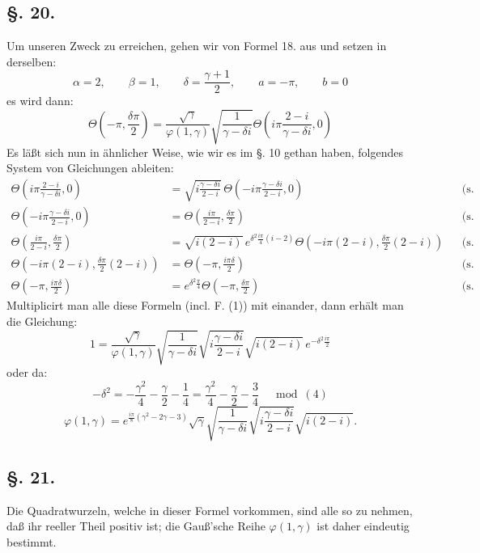 \documentclass[10pt]{article}
\newcommand{\sourceanchor}[1]{\hypertarget{source-#1}{}}
\begin{document}
\subsection*{\S. 20.}
Um unseren Zweck zu erreichen, gehen wir von Formel 18. aus und setzen in derselben:
\[
\alpha=2,
\qquad \beta=1,
\qquad \delta=\frac{\gamma+1}{2},
\qquad a=-\pi,
\qquad b=0
\]
es wird dann:
\begin{equation*}
\Theta\!\left(-\pi,\frac{\delta\pi}{2}\right)
=\frac{\sqrt{\gamma}}{\varphi(1,\gamma)}
\sqrt{\frac{1}{\gamma-\delta i}}
\Theta\!\left(i\pi\frac{2-i}{\gamma-\delta i},0\right)
\tag{1}
\end{equation*}
Es läßt sich nun in ähnlicher Weise, wie wir es im \S. 10 gethan haben, folgendes System von Gleichungen ableiten:
\sourceanchor{PA17}
\begin{align*}
\Theta\!\left(i\pi\frac{2-i}{\gamma-\delta i},0\right)
&=\sqrt{i\frac{\gamma-\delta i}{2-i}}\,
\Theta\!\left(-i\pi\frac{\gamma-\delta i}{2-i},0\right) &&\text{(s. F. 7.)}\\
\Theta\!\left(-i\pi\frac{\gamma-\delta i}{2-i},0\right)
&=\Theta\!\left(\frac{i\pi}{2-i},\frac{\delta\pi}{2}\right) &&\text{(s. F. 5.)}\\
\Theta\!\left(\frac{i\pi}{2-i},\frac{\delta\pi}{2}\right)
&=\sqrt{i(2-i)}\,e^{\delta^{2}\frac{i\pi}{4}(i-2)}
\Theta\!\left(-i\pi(2-i),\frac{\delta\pi}{2}(2-i)\right) &&\text{(s. F. 7.)}\\
\Theta\!\left(-i\pi(2-i),\frac{\delta\pi}{2}(2-i)\right)
&=\Theta\!\left(-\pi,\frac{i\pi\delta}{2}\right) &&\text{(s. F. 1 und 4.)}\\
\Theta\!\left(-\pi,\frac{i\pi\delta}{2}\right)
&=e^{\delta^{2}\frac{\pi}{4}}\Theta\!\left(-\pi,\frac{\delta\pi}{2}\right) &&\text{(s. F. 7.)}
\end{align*}
Multiplicirt man alle diese Formeln (incl. F. (1)) mit einander, dann erhält man die Gleichung:
\[
1=\frac{\sqrt{\gamma}}{\varphi(1,\gamma)}
\sqrt{\frac{1}{\gamma-\delta i}}
\sqrt{i\frac{\gamma-\delta i}{2-i}}
\sqrt{i(2-i)}\,e^{-\delta^{2}\frac{i\pi}{2}}
\]
oder da:
\[
-\delta^{2}=-\frac{\gamma^{2}}{4}-\frac{\gamma}{2}-\frac{1}{4}
=\frac{\gamma^{2}}{4}-\frac{\gamma}{2}-\frac{3}{4}\quad \bmod(4)
\]
\begin{equation*}
\varphi(1,\gamma)=e^{\frac{i\pi}{8}(\gamma^{2}-2\gamma-3)}
\sqrt{\gamma}\sqrt{\frac{1}{\gamma-\delta i}}
\sqrt{i\frac{\gamma-\delta i}{2-i}}
\sqrt{i(2-i)}.
\tag{20}
\end{equation*}

\subsection*{\S. 21.}
Die Quadratwurzeln, welche in dieser Formel vorkommen, sind alle so zu nehmen, daß ihr reeller Theil positiv ist; die Gauß'sche Reihe \(\varphi(1,\gamma)\) ist daher eindeutig bestimmt.
\end{document}
